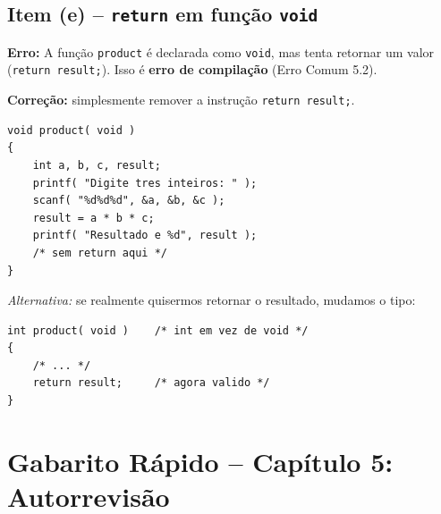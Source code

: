 \documentclass[12pt,a4paper]{article}
\begin{document}
\subsection*{Item (e) -- \texttt{return} em função \texttt{void}}
\begin{respostabox}
\textbf{Erro:} A função \texttt{product} é declarada como \texttt{void}, mas tenta
retornar um valor (\texttt{return result;}). Isso é \textbf{erro de compilação}
(Erro Comum 5.2).

\textbf{Correção:} simplesmente remover a instrução \texttt{return result;}.
\begin{lstlisting}
void product( void )
{
    int a, b, c, result;
    printf( "Digite tres inteiros: " );
    scanf( "%d%d%d", &a, &b, &c );
    result = a * b * c;
    printf( "Resultado e %d", result );
    /* sem return aqui */
}
\end{lstlisting}

\textit{Alternativa:} se realmente quisermos retornar o resultado, mudamos o tipo:
\begin{lstlisting}
int product( void )    /* int em vez de void */
{
    /* ... */
    return result;     /* agora valido */
}
\end{lstlisting}
\end{respostabox}

\newpage

\section*{Gabarito Rápido -- Capítulo 5: Autorrevisão}
\end{document}
